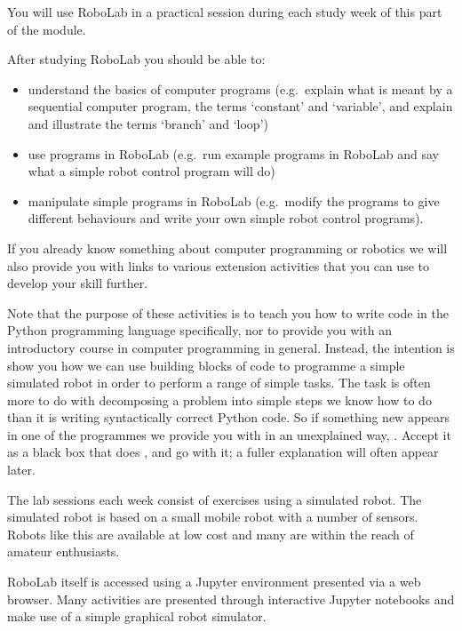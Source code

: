 \documentclass[letterpaper,10pt,english]{sphinxmanual}
\begin{document}
You will use RoboLab in a practical session during each study week of this part of the module.

After studying RoboLab you should be able to:
\begin{itemize}
\item {} 
understand the basics of computer programs (e.g. explain what is meant by a sequential computer program, the terms ‘constant’ and ‘variable’, and explain and illustrate the terms ‘branch’ and ‘loop’)

\item {} 
use programs in RoboLab (e.g. run example programs in RoboLab and say what a simple robot control program will do)

\item {} 
manipulate simple programs in RoboLab (e.g. modify the programs to give different behaviours and write your own simple robot control programs).

\end{itemize}

If you already know something about computer programming or robotics we will also provide you with links to various extension activities that you can use to develop your skill further.

Note that the purpose of these activities is  to teach you how to write code in the Python programming language specifically, nor to provide you with an introductory course in computer programming in general. Instead, the intention is show you how we can use building blocks of code to programme a simple simulated robot in order to perform a range of simple tasks. The  task is often more to do with decomposing a problem into simple steps we know how to do than it is writing
syntactically correct Python code. So if something new appears in one of the programmes we provide you with in an unexplained way, . Accept it as a black box that does , and go with it; a fuller explanation will often appear later.

The lab sessions each week consist of exercises using a simulated robot. The simulated robot is based on a small mobile robot with a number of sensors. Robots like this are available at low cost and many are within the reach of amateur enthusiasts.

RoboLab itself is accessed using a Jupyter environment presented via a web browser. Many activities are presented through interactive Jupyter notebooks and make use of a simple graphical robot simulator.
\end{document}
